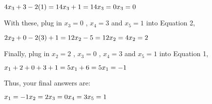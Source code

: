 \documentclass{article}
\begin{document}
    \begin{math}
        4x_3 + 3 - 2(1) = 1 \newline
        4x_3 + 1  = 1 \newline
        4x_3 = 0 \newline
        x_3 = 0 \newline  
    \end{math}

\raggedright With these, plug in \begin{math} x_3 = 0 \end{math} , \begin{math} x_4 = 3 \end{math} and \begin{math} x_5 = 1 \end{math} into Equation 2, \newline

    \begin{math}
        2x_2 + 0 - 2(3) + 1 = 1 \newline
        2x_2 - 5 = 1 \newline
        2x_2 = 4 \newline
        x_2 = 2 \newline
    \end{math}

\raggedright Finally, plug in \begin{math} x_2 = 2 \end{math} , \begin{math} x_3 = 0 \end{math} , \begin{math} x_4 = 3 \end{math} and \begin{math} x_5 = 1 \end{math} into Equation 1, \newline
    
    \begin{math}
        x_1 + 2 + 0 + 3 + 1 = 5 \newline
        x_1 + 6 = 5 \newline
        x_1 = -1 \newline 
    \end{math}

\raggedright Thus, your final answers are: \newline

    \begin{math}
        x_1 = -1 \newline
        x_2 = 2 \newline
        x_3 = 0 \newline
        x_4 = 3 \newline
        x_5 = 1 \newline
    \end{math}
\end{document}
